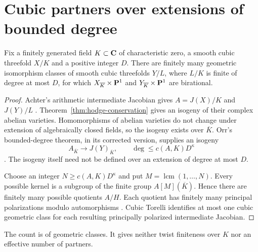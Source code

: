 \section{Cubic partners over extensions of bounded degree}
\label{sec:arithmetic-partners}
\begin{corollary}
\label{cor:bounded-degree-partners}%
Fix a finitely generated field $K\subset\mathbf C$ of characteristic zero, a smooth
cubic threefold $X/K$ and a positive integer $D$. There are finitely many
geometric isomorphism classes of smooth cubic threefolds $Y/L$, where
$L/K$ is finite of degree at most $D$, for which
$X_{\overline K}\times\mathbf P^1$ and $Y_{\overline K}\times\mathbf P^1$ are birational.
\end{corollary}
\begin{proof}
Achter's arithmetic intermediate Jacobian gives $A=J(X)/K$ and $J(Y)/L$
\cite[Theorem~B]{AchterTorelli}. Theorem~\ref{thm:hodge-conservation} gives
an isogeny of their complex abelian varieties. Homomorphisms of abelian
varieties do not change under extension of algebraically closed fields,
so the isogeny exists over $\overline K$.
Orr's bounded-degree theorem, in its corrected version, supplies an isogeny
\[
 A_{\overline K}\longrightarrow J(Y)_{\overline K},\qquad
 \deg\le c(A,K)D^\kappa
\]
\cite[Theorem~5.1]{OrrIsogenies}. The isogeny itself need not be defined
over an extension of degree at most $D$.

Choose an integer $N\ge c(A,K)D^\kappa$ and put
$M=\operatorname{lcm}(1,\ldots,N)$. Every possible kernel is a subgroup of
the finite group $A[M](\overline K)$. Hence there are finitely many possible
quotients $A/H$. Each quotient has finitely many principal polarizations
modulo automorphisms \cite[Theorem~1.1]{NarasimhanNori}.
Cubic Torelli \cite{CG} identifies at most one cubic geometric class for
each resulting principally polarized intermediate Jacobian.
%
%
\end{proof}
The count is of geometric classes. It gives neither twist finiteness over
$K$ nor an effective number of partners.
